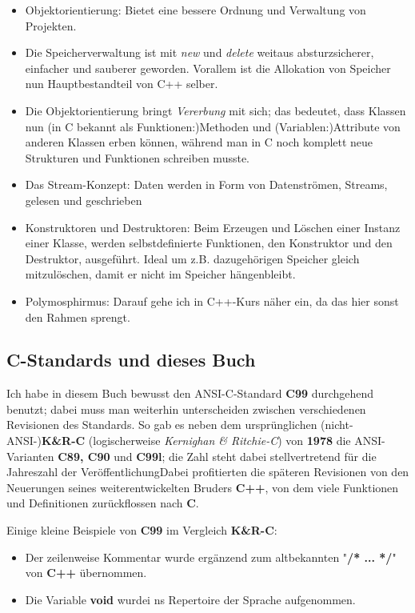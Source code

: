 \documentclass[b5paper,10pt,dvips,fleqn,titlepage,twoside]{book}
\begin{document}
\begin{itemize}
 \item Objektorientierung: Bietet eine bessere Ordnung und Verwaltung von Projekten.
\item Die Speicherverwaltung ist mit \emph{new} und \emph{delete} weitaus absturzsicherer, einfacher und sauberer geworden. Vorallem ist die Allokation von Speicher nun Hauptbestandteil von C++ selber.
\item Die Objektorientierung bringt \emph{Vererbung} mit sich; das bedeutet, dass Klassen nun (in C bekannt als Funktionen:)Methoden und (Variablen:)Attribute von anderen Klassen erben können, während man in C noch komplett neue Strukturen und Funktionen schreiben musste.
\item Das Stream-Konzept: Daten werden in Form von Datenströmen, Streams, gelesen und geschrieben
\item Konstruktoren und Destruktoren: Beim Erzeugen und Löschen einer Instanz einer Klasse, werden selbstdefinierte Funktionen, den Konstruktor und den Destruktor, ausgeführt. Ideal um z.B. dazugehörigen Speicher gleich mitzulöschen, damit er nicht im Speicher hängenbleibt.
\item Polymosphirmus: Darauf gehe ich in C++-Kurs näher ein, da das hier sonst den Rahmen sprengt.
\end{itemize}
\subsection{C-Standards und dieses Buch}
Ich habe in diesem Buch bewusst den ANSI-C-Standard \textbf{C99} durchgehend benutzt; dabei muss man weiterhin unterscheiden zwischen verschiedenen Revisionen des Standards. So gab es neben dem ursprünglichen (nicht-ANSI-)\textbf{K\&R-C} (logischerweise \emph{Kernighan \& Ritchie-C}) von \textbf{1978} die ANSI-Varianten \textbf{C89, C90} und \textbf{C99l}; die Zahl steht dabei stellvertretend für die Jahreszahl der Veröffentlichung\newline Dabei profitierten die späteren Revisionen von den Neuerungen seines weiterentwickelten Bruders \textbf{C++}, von dem viele Funktionen und Definitionen zurückflossen nach \textbf{C}.

Einige kleine Beispiele von \textbf{C99} im Vergleich \textbf{K\&R-C}:

\begin{itemize}
 \item Der zeilenweise Kommentar wurde ergänzend zum altbekannten "\textbf{/* ... */}" von \textbf{C++} übernommen.
\item Die Variable \textbf{void} wurdei ns Repertoire der Sprache aufgenommen.
\end{itemize}
\end{document}
